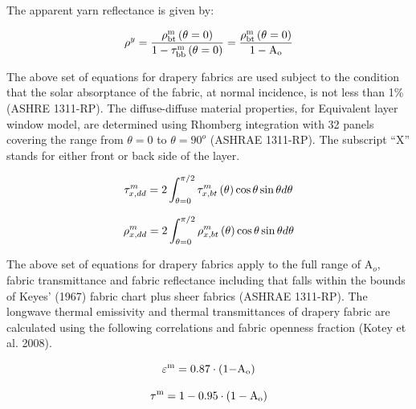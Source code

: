 The apparent yarn reflectance is given by:

\begin{equation}
{\rho ^y} = \frac{{\rho_{{\rm{bt}}}^{\rm{m}}\left( {{\rm{\theta }} = {\rm{0}}} \right)}}{{{\rm{1}} - \tau_{{\rm{bb}}}^{\rm{m}}\left( {{\rm{\theta }} = {\rm{0}}} \right)}} = \frac{{\rho_{{\rm{bt}}}^{\rm{m}}\left( {{\rm{\theta }} = {\rm{0}}} \right)}}{{{\rm{1}} - {{\rm{A}}_{\rm{o}}}}}
\end{equation}

The above set of equations for drapery fabrics are used subject to the condition that the solar absorptance of the fabric, at normal incidence, is not less than 1\% (ASHRE 1311-RP). The diffuse-diffuse material properties, for Equivalent layer window model, are determined using Rhomberg integration with 32 panels covering the range from $\theta = 0$ to $\theta = 90^{o}$ (ASHRAE 1311-RP). The subscript ``X'' stands for either front or back side of the layer.

\begin{equation}
  \tau_{x,dd}^{m} = 2\int_{\theta=0}^{\pi/2}\tau_{x,bt}^{m}\left(\theta\right)\cos\theta\sin\theta d\theta
\end{equation}

\begin{equation}
  \rho_{x,dd}^{m} = 2\int_{\theta=0}^{\pi/2}\rho_{x,bt}^{m}\left(\theta\right)\cos\theta\sin\theta d\theta
\end{equation}

The above set of equations for drapery fabrics apply to the full range of A\(_{o}\), fabric transmittance and fabric reflectance including that falls within the bounds of Keyes' (1967) fabric chart plus sheer fabrics (ASHRAE 1311-RP). The longwave thermal emissivity and thermal transmittances of drapery fabric are calculated using the following correlations and fabric openness fraction (Kotey et al. 2008).

\begin{equation}
{\varepsilon ^{\rm{m}}} = {\rm{0}}{\rm{.87}} \cdot \left( {{\rm{1 - }}{{\rm{A}}_{\rm{o}}}} \right)
\end{equation}

\begin{equation}
{\tau ^{\rm{m}}} = {\rm{1}} - {\rm{0}}{\rm{.95}} \cdot \left( {{\rm{1}} - {{\rm{A}}_{\rm{o}}}} \right)
\end{equation}

